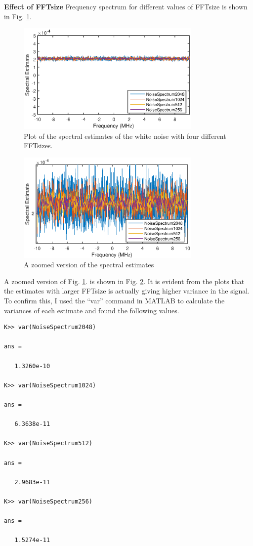 \documentclass[12pt]{article}
\begin{document}
\textbf{Effect of FFTsize}
Frequency spectrum for different values of FFTsize is shown in Fig. \ref{fig:spectralEst_FFTsize}.
\begin{figure}[h]
    \centering
    \includegraphics[width=0.8\textwidth]{spectralestimate_FFTsize}
    \caption{Plot of the spectral estimates of the white noise with four different FFTsizes. }
    \label{fig:spectralEst_FFTsize}
\end{figure}
\begin{figure}[h]
    \centering
    \includegraphics[width=0.8\textwidth]{spectralestimate_FFTsize_Zoomed}
    \caption{A zoomed version of the spectral estimates}
    \label{fig:spectralEst_FFTsize_Zoomed}
\end{figure}
A zoomed version of Fig. \ref{fig:spectralEst_FFTsize}. is shown in Fig. \ref{fig:spectralEst_FFTsize_Zoomed}. It is evident from the plots that the estimates with larger FFTsize is actually giving higher variance in the signal. To confirm this, I used the ``var'' command in MATLAB to calculate the variances of each estimate and found the following values.
\begin{verbatim}
K>> var(NoiseSpectrum2048)

ans =

   1.3260e-10

K>> var(NoiseSpectrum1024)

ans =

   6.3638e-11

K>> var(NoiseSpectrum512)

ans =

   2.9683e-11

K>> var(NoiseSpectrum256)

ans =

   1.5274e-11
\end{verbatim}
\end{document}
